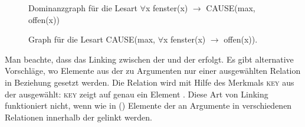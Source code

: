 \begin{figure}
\caption{Dominanzgraph für die Lesart $\forall$x fenster(x) $\to$ CAUSE(max, offen(x))\label{fig-alle-cause}}
\end{figure}
\begin{figure}
\caption{Graph für die Lesart CAUSE(max, $\forall$x fenster(x) $\to$ offen(x)).\label{fig-cause-alle}}
\end{figure}
Man beachte, dass das Linking zwischen der \argstl und der \relsl erfolgt. Es gibt
alternative Vorschläge, wo Elemente aus der \argstl zu Argumenten nur einer ausgewählten Relation in
Beziehung gesetzt werden. Die Relation wird mit Hilfe des Merkmals \textsc{key} aus der \relsl
ausgewählt: \textsc{key} zeigt auf genau ein Element \citep{Flickinger2000a}. Diese Art von Linking
funktioniert nicht, wenn wie in () Elemente der \argstl an Argumente in verschiedenen Relationen innerhalb der
\relsl gelinkt werden.

